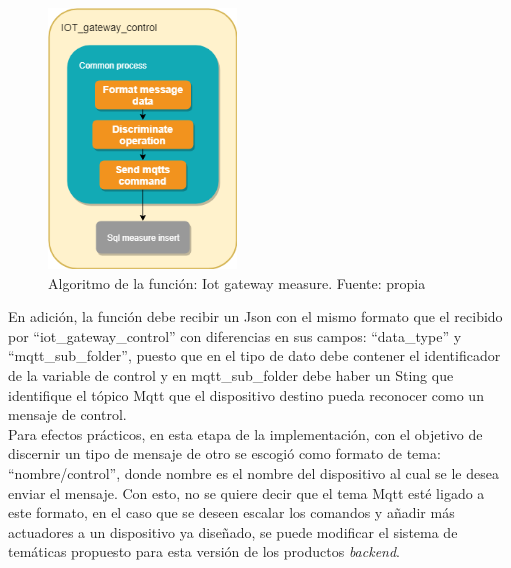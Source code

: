 \begin{figure}[htbp]
	\centerline{\includegraphics[width=5cm]{figuras/algoritmo_iot_measure.png}}
	\caption{Algoritmo de la función: Iot gateway measure. Fuente: propia}
	\label{fig_31}
\end{figure}

En adición, la función debe recibir un Json con el mismo formato que el recibido por ``iot\_gateway\_control'' con diferencias en sus campos: ``data\_type'' y ``mqtt\_sub\_folder'', puesto que en el tipo de dato debe contener el identificador de la variable de control y en mqtt\_sub\_folder debe haber un Sting que identifique el tópico Mqtt que el dispositivo destino pueda reconocer como un mensaje de control. 
\vspace{0.5cm}\\
Para efectos prácticos, en esta etapa de la implementación, con el objetivo de discernir un tipo de mensaje de otro se escogió como formato de tema: ``{nombre}/control'', donde {nombre} es el nombre del dispositivo al cual se le desea enviar el mensaje. Con esto, no se quiere decir que el tema Mqtt esté ligado a este formato, en el caso que se deseen escalar los comandos y añadir más actuadores a un dispositivo ya diseñado, se puede modificar el sistema de temáticas propuesto para esta versión de los productos  \textit{backend}.

